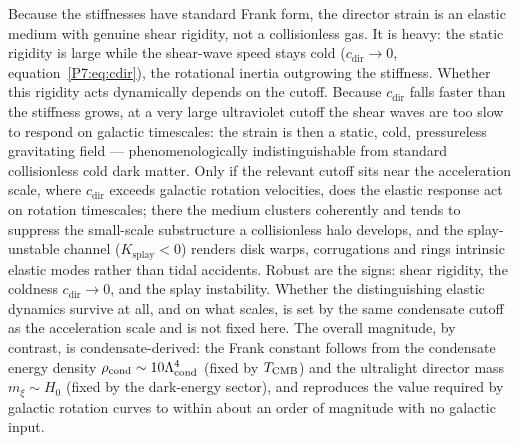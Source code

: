 \begin{remark}
\label{P7:rem:elastic_solid}
Because the stiffnesses have standard Frank form, the director strain
is an elastic medium with genuine shear rigidity, not a collisionless
gas. It is heavy: the static rigidity is large while the shear-wave
speed stays cold ($c_{\mathrm{dir}}\to0$, equation~\eqref{P7:eq:cdir}),
the rotational inertia outgrowing the stiffness. Whether this rigidity
acts dynamically depends on the cutoff. Because $c_{\mathrm{dir}}$
falls faster than the stiffness grows, at a very large ultraviolet
cutoff the shear waves are too slow to respond on galactic timescales:
the strain is then a static, cold, pressureless gravitating field ---
phenomenologically indistinguishable from standard collisionless cold
dark matter. Only if the relevant cutoff sits near the acceleration
scale, where $c_{\mathrm{dir}}$ exceeds galactic rotation velocities,
does the elastic response act on rotation timescales; there the
medium clusters coherently and tends to suppress the small-scale
substructure a collisionless halo develops, and the splay-unstable
channel ($K_{\mathrm{splay}}<0$) renders disk warps, corrugations and
rings intrinsic elastic modes rather than tidal accidents. Robust are
the signs: shear rigidity, the coldness $c_{\mathrm{dir}}\to0$, and
the splay instability. Whether the distinguishing elastic dynamics
survive at all, and on what scales, is set by the same condensate
cutoff as the acceleration scale and is not fixed here. The overall
magnitude, by contrast, is condensate-derived: the Frank constant
follows from the condensate energy density $\rho_{\mathrm{cond}}\sim10\Lambda_{\mathrm{cond}}^4$
(fixed by $T_{\mathrm{CMB}}$) and the ultralight director mass $m_\xi\sim H_0$
(fixed by the dark-energy sector), and reproduces the value required
by galactic rotation curves to within about an order of magnitude
with no galactic input.
\end{remark}

